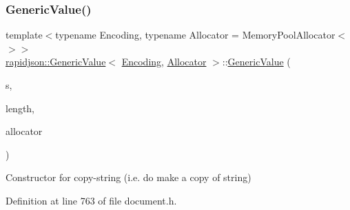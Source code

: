 \subsubsection{\texorpdfstring{GenericValue()}{GenericValue()}\hspace{0.1cm}{\footnotesize\ttfamily [14/17]}}
{\footnotesize\ttfamily template$<$typename Encoding, typename Allocator = Memory\+Pool\+Allocator$<$$>$$>$ \\
\mbox{\hyperlink{classrapidjson_1_1_generic_value}{rapidjson\+::\+Generic\+Value}}$<$ \mbox{\hyperlink{classrapidjson_1_1_encoding}{Encoding}}, \mbox{\hyperlink{classrapidjson_1_1_allocator}{Allocator}} $>$\+::\mbox{\hyperlink{classrapidjson_1_1_generic_value}{Generic\+Value}} (\begin{DoxyParamCaption}\item[{const \mbox{\hyperlink{classrapidjson_1_1_generic_value_adcdbc7fa85a9a41b78966d7e0dcc2ac4}{Ch}} $\ast$}]{s,  }\item[{\mbox{\hyperlink{namespacerapidjson_a44eb33eaa523e36d466b1ced64b85c84}{Size\+Type}}}]{length,  }\item[{\mbox{\hyperlink{classrapidjson_1_1_allocator}{Allocator}} \&}]{allocator }\end{DoxyParamCaption})}



Constructor for copy-\/string (i.\+e. do make a copy of string) 



Definition at line 763 of file document.\+h.


\begin{DoxyCode}{0}

\end{DoxyCode}
\mbox{\label{classrapidjson_1_1_generic_value_a83ba61e8a5170c2e172fd60ebc11016f}} 
